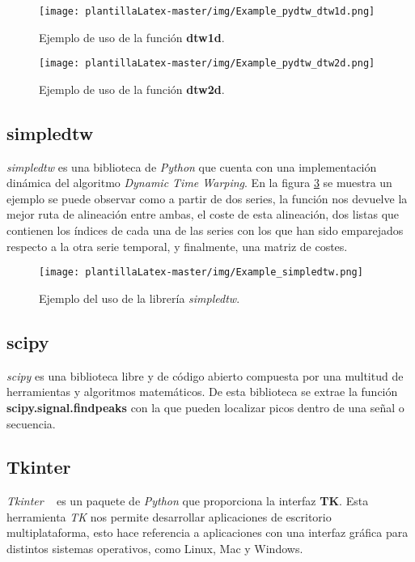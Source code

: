 \begin{figure}[H]
    \centering
    \texttt{[image: plantillaLatex-master/img/Example\_pydtw\_dtw1d.png]}
    \caption{Ejemplo de uso de la función \textbf{dtw1d}.}
    \label{fig:dtw1d}
\end{figure}

\begin{figure}[H]
    \centering
    \texttt{[image: plantillaLatex-master/img/Example\_pydtw\_dtw2d.png]}
    \caption{Ejemplo de uso de la función \textbf{dtw2d}.}
    \label{fig:dtw2d}
\end{figure}


\subsection{simpledtw}
\textit{simpledtw} es una biblioteca de \textit{Python} que cuenta con una implementación dinámica del algoritmo \emph{Dynamic Time Warping}. En la figura \ref{fig:simp} se muestra un ejemplo se puede observar como a partir de dos series, la función nos devuelve la mejor ruta de alineación entre ambas, el coste de esta alineación, dos listas que contienen los índices de cada una de las series con los que han sido emparejados respecto a la otra serie temporal, y finalmente, una matriz de costes.

\begin{figure}[H]
    \centering
    \texttt{[image: plantillaLatex-master/img/Example\_simpledtw.png]}
    \caption{Ejemplo del uso de la librería \textit{simpledtw}.}
    \label{fig:simp}
\end{figure}

\subsection{scipy}
\textit{scipy} es una biblioteca libre y de código abierto compuesta por una multitud de herramientas y algoritmos matemáticos. De esta biblioteca se extrae la función \textbf{scipy.signal.findpeaks} con la que pueden localizar picos dentro de una señal o secuencia. 

\subsection{Tkinter}
\textit{Tkinter} ~\cite{beniz2016using} es un paquete de \textit{Python} que proporciona la interfaz \textbf{TK}. Esta herramienta \textit{TK} nos permite desarrollar aplicaciones de escritorio multiplataforma, esto hace referencia a aplicaciones con una interfaz gráfica para distintos sistemas operativos, como Linux, Mac y Windows. 

